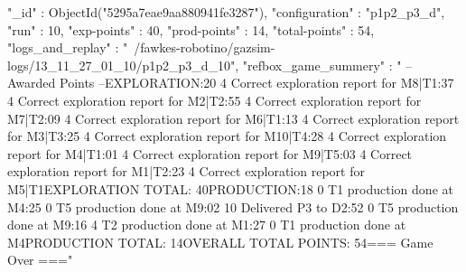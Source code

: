 { "_id" : ObjectId("5295a7eae9aa880941fe3287"), "configuration" : "p1p2_p3_d", "run" : 10, "exp-points" : 40, "prod-points" : 14, "total-points" : 54, "logs_and_replay" : "~/fawkes-robotino/gazsim-logs/13_11_27_01_10/p1p2_p3_d_10", "refbox_game_summery" : " -- Awarded Points --\n EXPLORATION:20   4  Correct exploration report for M8|T1:37   4  Correct exploration report for M2|T2:55   4  Correct exploration report for M7|T2:09   4  Correct exploration report for M6|T1:13   4  Correct exploration report for M3|T3:25   4  Correct exploration report for M10|T4:28   4  Correct exploration report for M4|T1:01   4  Correct exploration report for M9|T5:03   4  Correct exploration report for M1|T2:23   4  Correct exploration report for M5|T1\n EXPLORATION TOTAL: 40\n PRODUCTION:18   0  T1 production done at M4:25   0  T5 production done at M9:02  10  Delivered P3 to D2:52   0  T5 production done at M9:16   4  T2 production done at M1:27   0  T1 production done at M4\n PRODUCTION TOTAL: 14\n OVERALL TOTAL POINTS: 54\n ===  Game Over  ===\n" }
